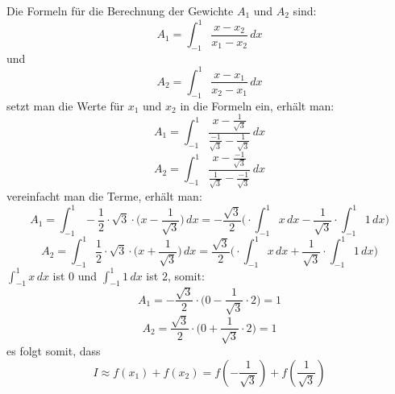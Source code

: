 Die Formeln für die Berechnung der Gewichte $A_{1}$ und $A_{2}$ sind:
\begin{equation*}
    A_{1} = \int_{-1}^{1} \frac{x - x_{2}}{x_{1} - x_{2}} \, dx
\end{equation*}
und
\begin{equation}
    A_{2} = \int_{-1}^{1} \frac{x - x_{1}}{x_{2} - x_{1}} \, dx
\end{equation}
setzt man die Werte für $x_{1}$ und $x_{2}$ in die Formeln ein, erhält man:
\begin{equation*}
    A_{1} = \int_{-1}^{1} \frac{x - \frac{1}{\sqrt{3}}}{\frac{-1}{\sqrt{3}} - \frac{1}{\sqrt{3}}} \, dx
\end{equation*}
\begin{equation}
    A_{2} = \int_{-1}^{1} \frac{x - \frac{-1}{\sqrt{3}}}{\frac{1}{\sqrt{3}} - \frac{-1}{\sqrt{3}}} \, dx
\end{equation}
vereinfacht man die Terme, erhält man:
\begin{equation*}
    A_{1} 
    =
    \int_{-1}^{1} -\frac{1}{2} 
    \cdot \sqrt{3} 
    \cdot \bigg(x - \frac{1}{\sqrt{3}}\bigg)
    \, dx
    =
    -\frac{\sqrt{3}}{2} 
    \bigg(
    \cdot \int_{-1}^{1}x\,dx
    -
    \frac{1}{\sqrt{3}} 
    \cdot \int_{-1}^{1}1\,dx
    \bigg)
\end{equation*}
\begin{equation}
    A_{2} 
    =
    \int_{-1}^{1} \frac{1}{2} 
    \cdot \sqrt{3}  
    \cdot \bigg(x + \frac{1}{\sqrt{3}}\bigg)
    \, dx
    =
    \frac{\sqrt{3}}{2} 
    \bigg(
    \cdot \int_{-1}^{1}x\,dx
    +
    \frac{1}{\sqrt{3}} 
    \cdot \int_{-1}^{1}1\,dx
    \bigg)
\end{equation}
$\int_{-1}^{1}x\,dx$ ist $0$ und $\int_{-1}^{1}1\,dx$ ist $2$, somit:
\begin{equation*}
    A_{1} 
    =
    -\frac{\sqrt{3}}{2} 
    \cdot 
    \bigg( 0
    -
    \frac{1}{\sqrt{3}} 
    \cdot 2
    \bigg)
    =
    1
\end{equation*}
\begin{equation}
    A_{2} 
    =
    \frac{\sqrt{3}}{2} 
    \cdot
    \bigg( 0
    +
    \frac{1}{\sqrt{3}} 
    \cdot 2
    \bigg)
    = 
    1
\end{equation}
es folgt somit, dass
\begin{equation}
    I 
    \approx 
    f(x_{1})+f(x_{2}) 
    = 
    f(-\frac{1}{\sqrt{3}})
    +
    f(\frac{1}{\sqrt{3}})
\end{equation}


